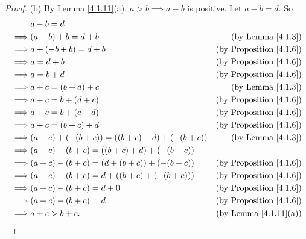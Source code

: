 \begin{proof}{(b)}
By Lemma \ref{4.1.11}(a), \(a > b \implies a - b\) is positive.
Let \(a - b = d\).
So
\begin{align*}
& a - b = d \\
\implies & (a - b) + b = d + b & \text{(by Lemma \ref{4.1.3})} \\
\implies & a + (-b + b) = d + b & \text{(by Proposition \ref{4.1.6})} \\
\implies & a = d + b & \text{(by Proposition \ref{4.1.6})} \\
\implies & a = b + d & \text{(by Proposition \ref{4.1.6})} \\
\implies & a + c = (b + d) + c & \text{(by Lemma \ref{4.1.3})} \\
\implies & a + c = b + (d + c) & \text{(by Proposition \ref{4.1.6})} \\
\implies & a + c = b + (c + d) & \text{(by Proposition \ref{4.1.6})} \\
\implies & a + c = (b + c) + d & \text{(by Proposition \ref{4.1.6})} \\
\implies & (a + c) + (-(b + c)) = ((b + c) + d) + (-(b + c)) & \text{(by Lemma \ref{4.1.3})} \\
\implies & (a + c) - (b + c) = ((b + c) + d) + (-(b + c)) \\
\implies & (a + c) - (b + c) = (d + (b + c)) + (-(b + c)) & \text{(by Proposition \ref{4.1.6})} \\
\implies & (a + c) - (b + c) = d + ((b + c) + (-(b + c))) & \text{(by Proposition \ref{4.1.6})} \\
\implies & (a + c) - (b + c) = d + 0 & \text{(by Proposition \ref{4.1.6})} \\
\implies & (a + c) - (b + c) = d & \text{(by Proposition \ref{4.1.6})} \\
\implies & a + c > b + c. & \text{(by Lemma \ref{4.1.11}(a))} \\
\end{align*}
\end{proof}

